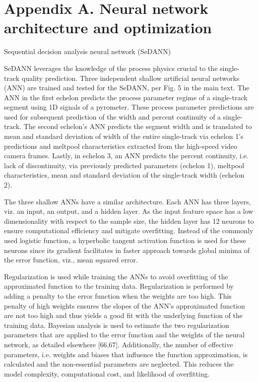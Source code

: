\documentclass[10pt]{article}
\begin{document}
\section*{Appendix A. Neural network architecture and optimization}
Sequential decision analysis neural network (SeDANN)

SeDANN leverages the knowledge of the process physics crucial to the single-track quality prediction. Three independent shallow artificial neural networks (ANN) are trained and tested for the SeDANN, per Fig. 5 in the main text. The ANN in the first echelon predicts the process parameter regime of a single-track segment using 1D signals of a pyrometer. These process parameter predictions are used for subsequent prediction of the width and percent continuity of a single-track. The second echelon's ANN predicts the segment width and is translated to mean and standard deviation of width of the entire single-track via echelon 1's predictions and meltpool characteristics extracted from the high-speed video camera frames. Lastly, in echelon 3, an ANN predicts the percent continuity, i.e. lack of discontinuity, via previously predicted parameters (echelon 1), meltpool characteristics, mean and standard deviation of the single-track width (echelon 2).

The three shallow ANNs have a similar architecture. Each ANN has three layers, viz. an input, an output, and a hidden layer. As the input feature space has a low dimensionality with respect to the sample size, the hidden layer has 12 neurons to ensure computational efficiency and mitigate overfitting. Instead of the commonly used logistic function, a hyperbolic tangent activation function is used for these neurons since its gradient facilitates in faster approach towards global minima of the error function, viz., mean squared error.

Regularization is used while training the ANNs to avoid overfitting of the approximated function to the training data. Regularization is performed by adding a penalty to the error function when the weights are too high. This penalty of high weights ensures the slopes of the ANN's approximated function are not too high and thus yields a good fit with the underlying function of the training data. Bayesian analysis is used to estimate the two regularization parameters that are applied to the error function and the weights of the neural network, as detailed elsewhere [66,67]. Additionally, the number of effective parameters, i.e. weights and biases that influence the function approximation, is calculated and the non-essential parameters are neglected. This reduces the model complexity, computational cost, and likelihood of overfitting.
\end{document}
